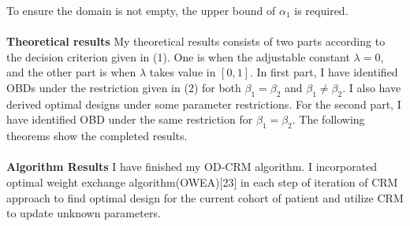 \documentclass[12pt]{article}
\begin{document}
 To ensure the domain is not empty, the upper bound of $\alpha_1$ is required.\\
 \\
 \textbf{Theoretical results}
 My theoretical results consists of two parts according to the decision criterion given in (1). One is when the adjustable constant $\lambda=0$, and the other part is when $\lambda$ takes value in $[0,1]$. In first part, I have identified OBDs under the restriction given in (2) for both $\beta_1=\beta_2$ and $\beta_1 \neq \beta_2$. I also have derived optimal designs under some parameter restrictions. For the second part, I have identified OBD under the same restriction for $\beta_1=\beta_2$.  The following theorems show the completed results.\\
 \\
\textbf{Algorithm Results}
I have finished my OD-CRM algorithm. I incorporated optimal weight exchange algorithm(OWEA)[23] in each step of iteration of CRM approach to find optimal design for the current cohort of patient and utilize CRM to update unknown parameters. 
\end{document}
